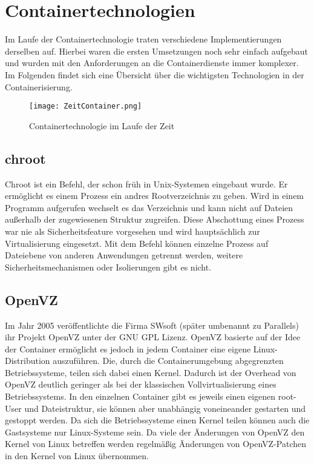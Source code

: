 \section{Containertechnologien} 
\label{sec:Containertechnologien}

Im Laufe der  Containertechnologie traten verschiedene Implementierungen derselben auf. Hierbei waren die ersten Umsetzungen noch sehr einfach aufgebaut und wurden mit den Anforderungen an die Containerdienste immer komplexer. Im Folgenden findet sich eine Übersicht über die wichtigsten Technologien in der Containerisierung.

\begin{figure}[H]
	\begin{center}
		\texttt{[image: ZeitContainer.png]}
	\end{center}
	\caption[Containertechnologie im Laufe der Zeit]{Containertechnologie im Laufe der Zeit}
	\label{fig:CTZeit}
\end{figure}


\subsection{chroot}
\label{sec:chroot}

Chroot ist ein Befehl, der schon früh in Unix-Systemen eingebaut wurde. Er ermöglicht es einem Prozess ein andres Rootverzeichnis zu geben. Wird in einem Programm  aufgerufen wechselt es das Verzeichnis und kann nicht auf Dateien außerhalb der zugewiesenen Struktur zugreifen. Diese Abschottung eines Prozess war nie als Sicherheitsfeature vorgesehen und wird hauptsächlich zur Virtualisierung eingesetzt. Mit dem Befehl können einzelne Prozess auf Dateiebene von anderen Anwendungen getrennt werden, weitere Sicherheitsmechanismen oder Isolierungen gibt es nicht.\cite{IEEE7830207,569694, MANPAGE01}

\subsection{OpenVZ}
\label{sec:OpenVZ}

Im Jahr 2005 veröffentlichte die Firma SWsoft (später umbenannt zu Parallels) ihr Projekt OpenVZ unter der GNU GPL Lizenz. OpenVZ basierte auf der Idee der Container ermöglicht es jedoch in jedem Container eine eigene Linux-Distribution auszuführen. Die, durch die Containerumgebung abgegrenzten Betriebssysteme, teilen sich dabei einen Kernel. Dadurch ist der Overhead von OpenVZ deutlich geringer als bei der klassischen Vollvirtualisierung eines Betriebssystems. In den einzelnen Container gibt es jeweils einen eigenen root-User und Dateistruktur, sie können aber unabhängig voneineander gestarten und gestoppt werden. Da sich die Betriebssysteme einen Kernel teilen können auch die Gastsysteme nur Linux-Systeme sein. Da viele der Änderungen von OpenVZ den Kernel von Linux betreffen werden regelmäßig Änderungen von OpenVZ-Patchen in den Kernel von Linux übernommen.\cite{OpenVzNews, IEEE4803091,OpenVzHist}


